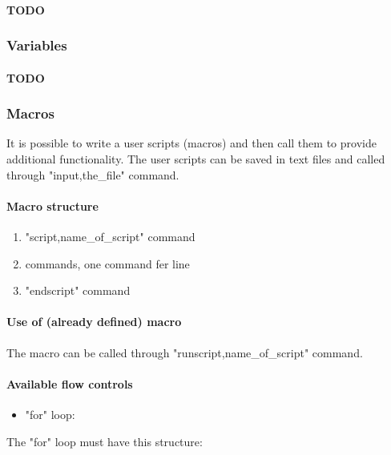 \documentclass{article}
\begin{document}
\paragraph{TODO}

\subsubsection{Variables}

\paragraph{TODO}

\subsubsection{Macros}

 It is possible to write a user scripts (macros) and then call them to
 provide additional functionality. The user scripts can be
 saved in text files and called through "input,the\_file"
 command.



\paragraph{Macro structure}
\begin{enumerate}
\item  "script,name\_of\_script" command
\item  commands, one command fer line
\item  "endscript" command
\end{enumerate}

\paragraph{Use of (already defined) macro}

 The macro can be called through
 "runscript,name\_of\_script" command.



\paragraph{Available flow controls}
\begin{itemize}
\item  "for" loop:
\end{itemize}

 The "for" loop must have this structure:
\end{document}
